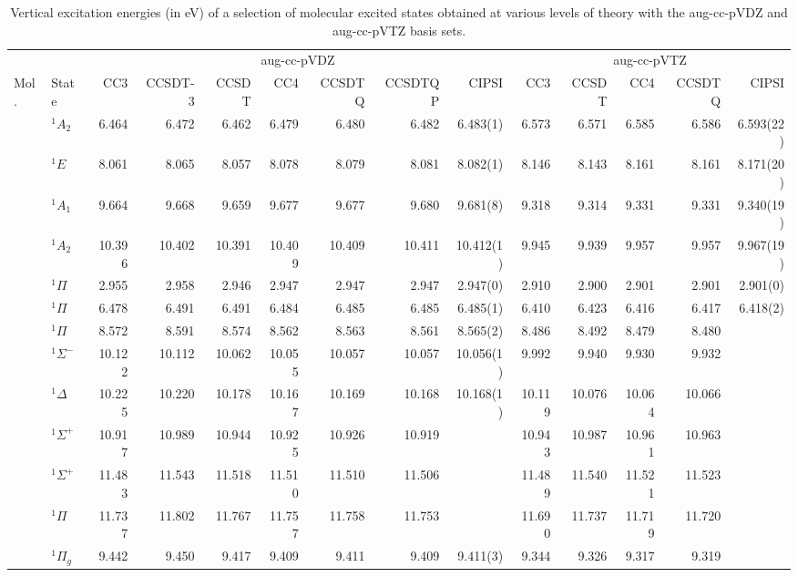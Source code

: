 \documentclass[aip,jcp,reprint,noshowkeys,superscriptaddress]{revtex4-1}
\newcommand{\mc}{\multicolumn}
\begin{document}
\begin{squeezetable}
\begin{table*}
	\caption{Vertical excitation energies (in eV) of a selection of molecular excited states obtained at various levels of theory with the aug-cc-pVDZ and aug-cc-pVTZ basis sets.
	\label{tab:BigTab}}
	\begin{ruledtabular}
	\begin{tabular}{llrrrrrrrrrrrr}
				&		&	\mc{7}{c}{aug-cc-pVDZ}		&		\mc{5}{c}{aug-cc-pVTZ}		\\	
				\cline{3-9} \cline{10-14}
	Mol.	&	State				&CC3	&CCSDT-3&CCSDT	&CC4	&CCSDTQ	&CCSDTQP	&CIPSI	
									&CC3	&CCSDT	&CC4	&CCSDTQ	&CIPSI			\\
	\hline
	\ce{NH3}	&	$^1A_2$ 		&6.464	&6.472	&6.462	&6.479	&6.480	&6.482	&6.483(1)	&6.573	&6.571	&6.585	&6.586	&	6.593(22)	\\	
				&	$^1E$			&8.061	&8.065	&8.057	&8.078	&8.079	&8.081	&8.082(1)	&8.146	&8.143	&8.161	&8.161	&	8.171(20)	\\	
				&	$^1A_1$ 		&9.664	&9.668	&9.659	&9.677	&9.677	&9.680	&9.681(8)	&9.318	&9.314	&9.331	&9.331	&	9.340(19)	\\
				&	$^1A_2$ 		&10.396	&10.402	&10.391	&10.409	&10.409	&10.411	&10.412(1)	&9.945	&9.939	&9.957	&9.957	&	9.967(19)	\\
	\ce{BH}		&	$^1\Pi$ 		&2.955	&2.958	&2.946	&2.947	&2.947	&2.947	&2.947(0)	&2.910	&2.900	&2.901	&2.901	&2.901(0)	\\
	\ce{BF}		&	$^1\Pi$ 		&6.478	&6.491	&6.491	&6.484	&6.485	&6.485	&6.485(1)	&6.410	&6.423	&6.416	&6.417	&6.418(2)\\
	\ce{CO}		&	$^1\Pi$ 		&8.572	&8.591	&8.574	&8.562	&8.563	&8.561	&8.565(2)	&8.486	&8.492	&8.479	&8.480	&	\\
				&	$^1\Sigma^-$ 	&10.122	&10.112	&10.062	&10.055	&10.057	&10.057	&10.056(1)	&9.992	&9.940	&9.930	&9.932	&	\\
				&	$^1\Delta$ 		&10.225	&10.220	&10.178	&10.167	&10.169	&10.168	&10.168(1)	&10.119	&10.076	&10.064	&10.066	&	\\
				&	$^1\Sigma^+$ 	&10.917	&10.989	&10.944	&10.925	&10.926	&10.919	&			&10.943	&10.987	&10.961	&10.963	&	\\
				&	$^1\Sigma^+$ 	&11.483	&11.543	&11.518	&11.510	&11.510	&11.506	&			&11.489	&11.540	&11.521	&11.523	&	\\
				&	$^1\Pi$ 		&11.737	&11.802	&11.767	&11.757	&11.758	&11.753	&			&11.690	&11.737	&11.719	&11.720	&	\\
	\ce{N2}		&	$^1\Pi_g$  		&9.442	&9.450	&9.417	&9.409	&9.411	&9.409	&9.411(3)	&9.344	&9.326	&9.317	&9.319	&	\\

\end{tabular}
\end{ruledtabular}
\end{table*}
\end{squeezetable}
\end{document}
